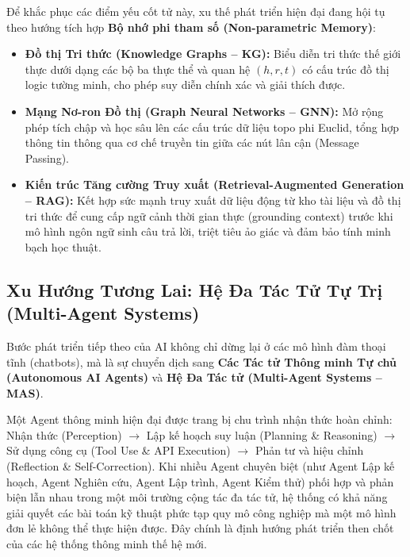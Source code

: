 \documentclass[12pt,a4paper]{report}
\begin{document}
Để khắc phục các điểm yếu cốt tử này, xu thế phát triển hiện đại đang hội tụ theo hướng tích hợp \textbf{Bộ nhớ phi tham số (Non-parametric Memory)}:
\begin{itemize}[leftmargin=1.2cm]
    \item \textbf{Đồ thị Tri thức (Knowledge Graphs -- KG):} Biểu diễn tri thức thế giới thực dưới dạng các bộ ba thực thể và quan hệ $(h, r, t)$ có cấu trúc đồ thị logic tường minh, cho phép suy diễn chính xác và giải thích được.
    \item \textbf{Mạng Nơ-ron Đồ thị (Graph Neural Networks -- GNN):} Mở rộng phép tích chập và học sâu lên các cấu trúc dữ liệu topo phi Euclid, tổng hợp thông tin thông qua cơ chế truyền tin giữa các nút lân cận (Message Passing).
    \item \textbf{Kiến trúc Tăng cường Truy xuất (Retrieval-Augmented Generation -- RAG):} Kết hợp sức mạnh truy xuất dữ liệu động từ kho tài liệu và đồ thị tri thức để cung cấp ngữ cảnh thời gian thực (grounding context) trước khi mô hình ngôn ngữ sinh câu trả lời, triệt tiêu ảo giác và đảm bảo tính minh bạch học thuật.
\end{itemize}

\subsection{Xu Hướng Tương Lai: Hệ Đa Tác Tử Tự Trị (Multi-Agent Systems)}
Bước phát triển tiếp theo của AI không chỉ dừng lại ở các mô hình đàm thoại tĩnh (chatbots), mà là sự chuyển dịch sang \textbf{Các Tác tử Thông minh Tự chủ (Autonomous AI Agents)} và \textbf{Hệ Đa Tác tử (Multi-Agent Systems -- MAS)}. 

Một Agent thông minh hiện đại được trang bị chu trình nhận thức hoàn chỉnh: Nhận thức (Perception) $\rightarrow$ Lập kế hoạch suy luận (Planning \& Reasoning) $\rightarrow$ Sử dụng công cụ (Tool Use \& API Execution) $\rightarrow$ Phản tư và hiệu chỉnh (Reflection \& Self-Correction). Khi nhiều Agent chuyên biệt (như Agent Lập kế hoạch, Agent Nghiên cứu, Agent Lập trình, Agent Kiểm thử) phối hợp và phản biện lẫn nhau trong một môi trường cộng tác đa tác tử, hệ thống có khả năng giải quyết các bài toán kỹ thuật phức tạp quy mô công nghiệp mà một mô hình đơn lẻ không thể thực hiện được. Đây chính là định hướng phát triển then chốt của các hệ thống thông minh thế hệ mới.

\newpage


\end{document}
